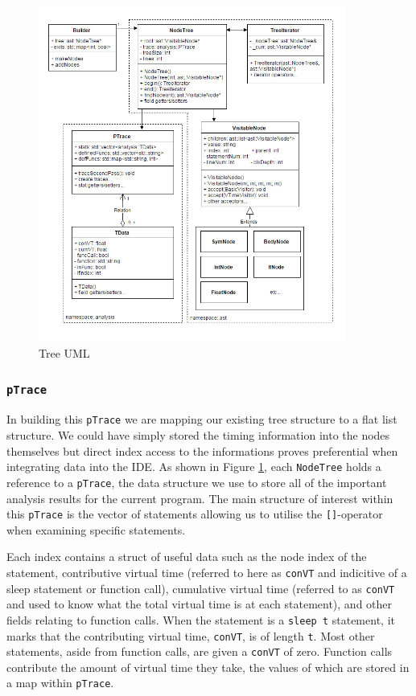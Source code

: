 \documentclass[11pt, abstracton, twoside, titlepage=true]{scrartcl}
\begin{document}
\begin{figure}[h!]
	\centering
	\includegraphics[width=0.9\textwidth]{images/timing.jpg}
	\caption{Tree UML} \label{tree}
\end{figure}

\subsubsection{\texttt{pTrace}} \label{pTrace}



In building this \texttt{pTrace} we are mapping our existing tree structure to a 
flat list structure. We could have simply stored the timing information into the 
nodes themselves but direct index access to the informations proves preferential 
when integrating data into the IDE. As shown in Figure \ref{tree}, each 
\texttt{NodeTree} holds a reference to a \texttt{pTrace}, the data structure we 
use to store all of the important analysis results for the current program. The main 
structure of interest within this \texttt{pTrace} is the vector of statements 
allowing us to utilise the \texttt{[]}-operator when examining specific statements.

Each index contains a struct of useful data such as the node index of the statement,
contributive virtual time (referred to here as \texttt{conVT} and indicitive of a 
sleep statement or function call), cumulative virtual time (referred to as 
\texttt{conVT} and used to know what the total virtual time is at each statement), 
and other fields relating to function calls. When the statement is a \texttt{sleep t} 
statement, it marks that the contributing virtual time, \texttt{conVT}, is of length 
\texttt{t}. Most other statements, aside from function calls, are given a 
\texttt{conVT} of zero. Function calls contribute the amount of virtual time they 
take, the values of which are stored in a map within \texttt{pTrace}.
\end{document}
